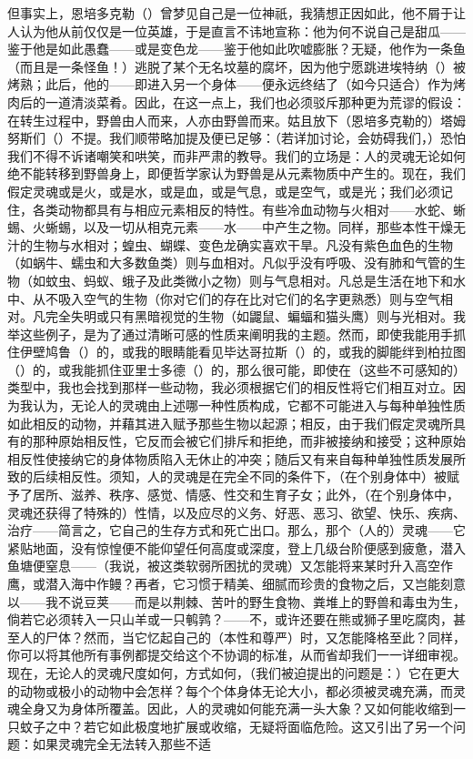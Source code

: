 但事实上，恩培多克勒（）曾梦见自己是一位神祇，我猜想正因如此，他不屑于让人认为他从前仅仅是一位英雄，于是直言不讳地宣称：他为何不说自己是甜瓜——鉴于他是如此愚蠢——或是变色龙——鉴于他如此吹嘘膨胀？无疑，他作为一条鱼（而且是一条怪鱼！）逃脱了某个无名坟墓的腐坏，因为他宁愿跳进埃特纳（）被烤熟；此后，他的——即进入另一个身体——便永远终结了（如今只适合）作为烤肉后的一道清淡菜肴。因此，在这一点上，我们也必须驳斥那种更为荒谬的假设：在转生过程中，野兽由人而来，人亦由野兽而来。姑且放下（恩培多克勒的）塔姆努斯们（）不提。我们顺带略加提及便已足够：（若详加讨论，会妨碍我们，）恐怕我们不得不诉诸嘲笑和哄笑，而非严肃的教导。我们的立场是：人的灵魂无论如何绝不能转移到野兽身上，即便哲学家认为野兽是从元素物质中产生的。现在，我们假定灵魂或是火，或是水，或是血，或是气息，或是空气，或是光；我们必须记住，各类动物都具有与相应元素相反的特性。有些冷血动物与火相对——水蛇、蜥蜴、火蜥蜴，以及一切从相克元素——水——中产生之物。同样，那些本性干燥无汁的生物与水相对；蝗虫、蝴蝶、变色龙确实喜欢干旱。凡没有紫色血色的生物（如蜗牛、蠕虫和大多数鱼类）则与血相对。凡似乎没有呼吸、没有肺和气管的生物（如蚊虫、蚂蚁、蛾子及此类微小之物）则与气息相对。凡总是生活在地下和水中、从不吸入空气的生物（你对它们的存在比对它们的名字更熟悉）则与空气相对。凡完全失明或只有黑暗视觉的生物（如鼹鼠、蝙蝠和猫头鹰）则与光相对。我举这些例子，是为了通过清晰可感的性质来阐明我的主题。然而，即使我能用手抓住伊壁鸠鲁（）的，或我的眼睛能看见毕达哥拉斯（）的，或我的脚能绊到柏拉图（）的，或我能抓住亚里士多德（）的，那么很可能，即使在（这些不可感知的）类型中，我也会找到那样一些动物，我必须根据它们的相反性将它们相互对立。因为我认为，无论人的灵魂由上述哪一种性质构成，它都不可能进入与每种单独性质如此相反的动物，并藉其进入赋予那些生物以起源；相反，由于我们假定灵魂所具有的那种原始相反性，它反而会被它们排斥和拒绝，而非被接纳和接受；这种原始相反性使接纳它的身体物质陷入无休止的冲突；随后又有来自每种单独性质发展所致的后续相反性。须知，人的灵魂是在完全不同的条件下，（在个别身体中）被赋予了居所、滋养、秩序、感觉、情感、性交和生育子女；此外，（在个别身体中，灵魂还获得了特殊的）性情，以及应尽的义务、好恶、恶习、欲望、快乐、疾病、治疗——简言之，它自己的生存方式和死亡出口。那么，那个（人的）灵魂——它紧贴地面，没有惊惶便不能仰望任何高度或深度，登上几级台阶便感到疲惫，潜入鱼塘便窒息——（我说，被这类软弱所困扰的灵魂）又怎能将来某时升入高空作鹰，或潜入海中作鳗？再者，它习惯于精美、细腻而珍贵的食物之后，又岂能刻意以——我不说豆荚——而是以荆棘、苦叶的野生食物、粪堆上的野兽和毒虫为生，倘若它必须转入一只山羊或一只鹌鹑？——不，或许还要在熊或狮子里吃腐肉，甚至人的尸体？然而，当它忆起自己的（本性和尊严）时，又怎能降格至此？同样，你可以将其他所有事例都提交给这个不协调的标准，从而省却我们一一详细审视。现在，无论人的灵魂尺度如何，方式如何，（我们被迫提出的问题是：）它在更大的动物或极小的动物中会怎样？每个个体身体无论大小，都必须被灵魂充满，而灵魂全身又为身体所覆盖。因此，人的灵魂如何能充满一头大象？又如何能收缩到一只蚊子之中？若它如此极度地扩展或收缩，无疑将面临危险。这又引出了另一个问题：如果灵魂完全无法转入那些不适
